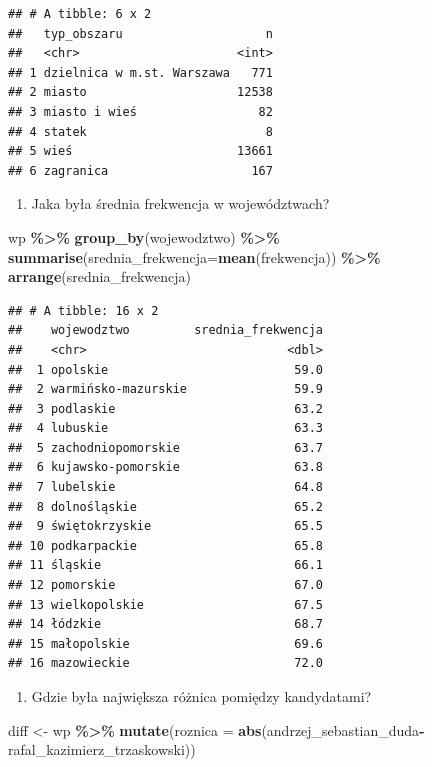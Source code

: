 \documentclass[
]{book}
\newenvironment{Shaded}{\begin{snugshade}}{\end{snugshade}}
\newcommand{\DataTypeTok}[1]{\textcolor[rgb]{0.13,0.29,0.53}{#1}}
\newcommand{\KeywordTok}[1]{\textcolor[rgb]{0.13,0.29,0.53}{\textbf{#1}}}
\newcommand{\NormalTok}[1]{#1}
\newcommand{\OperatorTok}[1]{\textcolor[rgb]{0.81,0.36,0.00}{\textbf{#1}}}
\newcommand{\StringTok}[1]{\textcolor[rgb]{0.31,0.60,0.02}{#1}}
\providecommand{\tightlist}{%
  \setlength{\itemsep}{0pt}\setlength{\parskip}{0pt}}
\begin{document}
\begin{verbatim}
## # A tibble: 6 x 2
##   typ_obszaru                    n
##   <chr>                      <int>
## 1 dzielnica w m.st. Warszawa   771
## 2 miasto                     12538
## 3 miasto i wieś                 82
## 4 statek                         8
## 5 wieś                       13661
## 6 zagranica                    167
\end{verbatim}

\begin{enumerate}
\def\labelenumi{\arabic{enumi}.}
\setcounter{enumi}{3}
\tightlist
\item
  Jaka była średnia frekwencja w województwach?
\end{enumerate}

\begin{Shaded}
\begin{Highlighting}[]
\NormalTok{wp }\OperatorTok{\%\textgreater{}\%}\StringTok{ }
\StringTok{  }\KeywordTok{group\_by}\NormalTok{(wojewodztwo) }\OperatorTok{\%\textgreater{}\%}\StringTok{ }
\StringTok{  }\KeywordTok{summarise}\NormalTok{(}\DataTypeTok{srednia\_frekwencja=}\KeywordTok{mean}\NormalTok{(frekwencja)) }\OperatorTok{\%\textgreater{}\%}\StringTok{ }
\StringTok{  }\KeywordTok{arrange}\NormalTok{(srednia\_frekwencja)}
\end{Highlighting}
\end{Shaded}

\begin{verbatim}
## # A tibble: 16 x 2
##    wojewodztwo         srednia_frekwencja
##    <chr>                            <dbl>
##  1 opolskie                          59.0
##  2 warmińsko-mazurskie               59.9
##  3 podlaskie                         63.2
##  4 lubuskie                          63.3
##  5 zachodniopomorskie                63.7
##  6 kujawsko-pomorskie                63.8
##  7 lubelskie                         64.8
##  8 dolnośląskie                      65.2
##  9 świętokrzyskie                    65.5
## 10 podkarpackie                      65.8
## 11 śląskie                           66.1
## 12 pomorskie                         67.0
## 13 wielkopolskie                     67.5
## 14 łódzkie                           68.7
## 15 małopolskie                       69.6
## 16 mazowieckie                       72.0
\end{verbatim}

\begin{enumerate}
\def\labelenumi{\arabic{enumi}.}
\setcounter{enumi}{4}
\tightlist
\item
  Gdzie była największa różnica pomiędzy kandydatami?
\end{enumerate}

\begin{Shaded}
\begin{Highlighting}[]
\NormalTok{diff \textless{}{-}}\StringTok{ }\NormalTok{wp }\OperatorTok{\%\textgreater{}\%}\StringTok{ }
\StringTok{  }\KeywordTok{mutate}\NormalTok{(}\DataTypeTok{roznica =} \KeywordTok{abs}\NormalTok{(andrzej\_sebastian\_duda}\OperatorTok{{-}}\NormalTok{rafal\_kazimierz\_trzaskowski))}
\end{Highlighting}
\end{Shaded}


  
\end{document}
